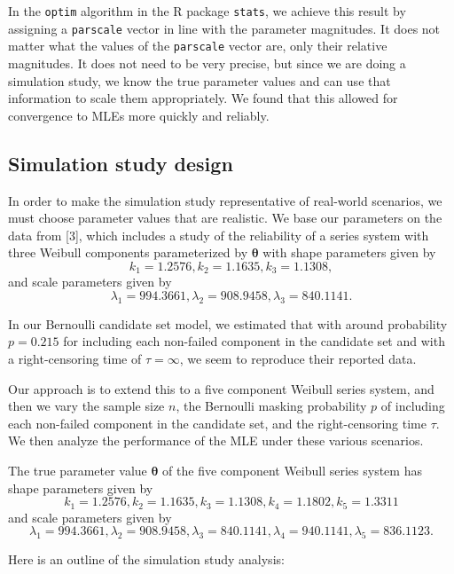 \documentclass[
]{article}
\begin{document}
In the \texttt{optim} algorithm in the R package \texttt{stats}, we
achieve this result by assigning a \texttt{parscale} vector in line with
the parameter magnitudes. It does not matter what the values of the
\texttt{parscale} vector are, only their relative magnitudes. It does
not need to be very precise, but since we are doing a simulation study,
we know the true parameter values and can use that information to scale
them appropriately. We found that this allowed for convergence to MLEs
more quickly and reliably.

\hypertarget{simulation-study-design}{%
\subsection{Simulation study design}\label{simulation-study-design}}

In order to make the simulation study representative of real-world
scenarios, we must choose parameter values that are realistic. We base
our parameters on the data from {[}3{]}, which includes a study of the
reliability of a series system with three Weibull components
parameterized by \(\boldsymbol{\theta}\) with shape parameters given by
\[
    k_1 = 1.2576,
    k_2 = 1.1635,
    k_3 = 1.1308,
\] and scale parameters given by \[
    \lambda_1 = 994.3661,
    \lambda_2 = 908.9458,
    \lambda_3 = 840.1141.
\]

In our Bernoulli candidate set model, we estimated that with around
probability \(p = 0.215\) for including each non-failed component in the
candidate set and with a right-censoring time of \(\tau = \infty\), we
seem to reproduce their reported data.

Our approach is to extend this to a five component Weibull series
system, and then we vary the sample size \(n\), the Bernoulli masking
probability \(p\) of including each non-failed component in the
candidate set, and the right-censoring time \(\tau\). We then analyze
the performance of the MLE under these various scenarios.

The true parameter value \(\boldsymbol{\theta}\) of the five component
Weibull series system has shape parameters given by \[
    k_1 = 1.2576,
    k_2 = 1.1635,
    k_3 = 1.1308,
    k_4 = 1.1802,
    k_5 = 1.3311
\] and scale parameters given by \[
    \lambda_1 = 994.3661,
    \lambda_2 = 908.9458,
    \lambda_3 = 840.1141,
    \lambda_4 = 940.1141,
    \lambda_5 = 836.1123.
\]

Here is an outline of the simulation study analysis:
\end{document}
